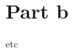 \documentclass{article}
\begin{document}


\tableofcontents
\lstlistoflistings
\listoffigures


\pagebreak



\pagebreak
\section{Part b}

etc
\end{document}
